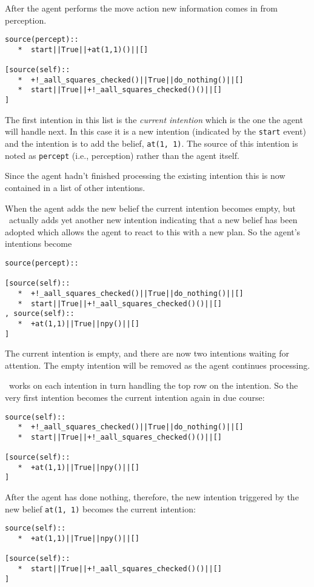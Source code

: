 After the agent performs the move action new information comes in from perception.

\begin{verbatim}
source(percept):: 
   *  start||True||+at(1,1)()||[]

[source(self):: 
   *  +!_aall_squares_checked()||True||do_nothing()||[]
   *  start||True||+!_aall_squares_checked()()||[]
] 
\end{verbatim}
The first intention in this list is the \emph{current intention} which is the one the agent will handle next.  In this case it is a new intention (indicated by the \texttt{start} event) and the intention is to add the belief, \texttt{at(1, 1)}.  The source of this intention is noted as \texttt{percept} (i.e., perception) rather than the agent itself.

Since the agent hadn't finished processing the existing intention this is now contained in a list of other intentions.

When the agent adds the new belief the current intention becomes empty, but \gwendolen\ actually adds yet another new intention indicating that a new belief has been adopted which allows the agent to react to this with a new plan.  So the agent's intentions become
\begin{verbatim}
source(percept):: 

[source(self):: 
   *  +!_aall_squares_checked()||True||do_nothing()||[]
   *  start||True||+!_aall_squares_checked()()||[]
, source(self):: 
   *  +at(1,1)||True||npy()||[]
] 
\end{verbatim}
The current intention is empty, and there are now two intentions waiting for attention.  The empty intention will be removed as the agent continues processing.

\gwendolen\ works on each intention in turn handling the top row on the intention.  So the very first intention becomes the current intention again in due course:
\begin{verbatim}
source(self):: 
   *  +!_aall_squares_checked()||True||do_nothing()||[]
   *  start||True||+!_aall_squares_checked()()||[]

[source(self):: 
   *  +at(1,1)||True||npy()||[]
] 
\end{verbatim}

After the agent has done nothing, therefore, the new intention triggered by the new belief \texttt{at(1, 1)} becomes the current intention:
\begin{verbatim}
source(self):: 
   *  +at(1,1)||True||npy()||[]

[source(self):: 
   *  start||True||+!_aall_squares_checked()()||[]
] 
\end{verbatim}

